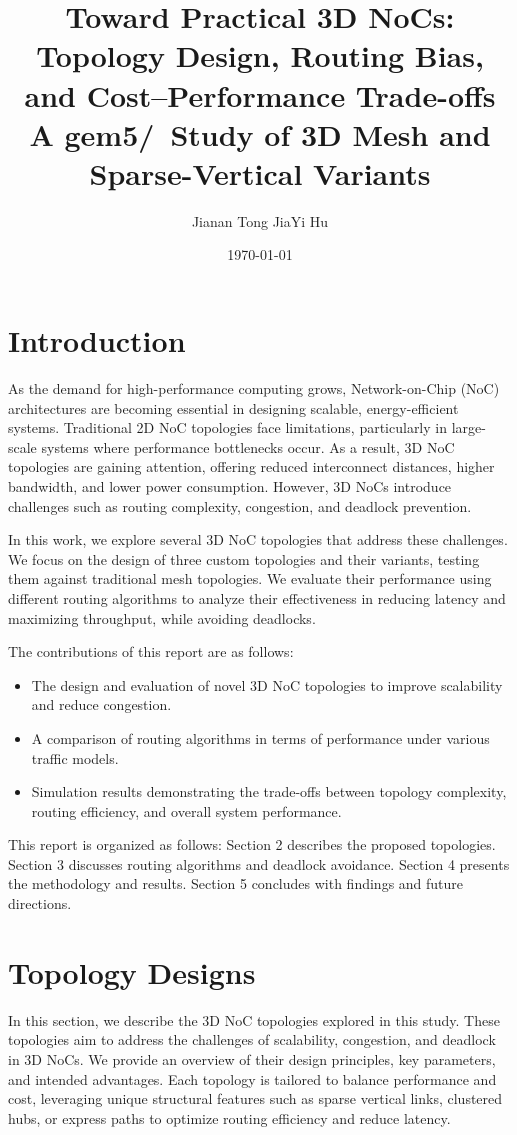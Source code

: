 \documentclass[11pt]{article}
\title{\textbf{Toward Practical 3D NoCs: Topology Design, Routing Bias, and Cost--Performance Trade-offs}\\
\large A gem5/\Ruby\ Study of 3D Mesh and Sparse-Vertical Variants}
\author{Jianan Tong \quad JiaYi Hu}
\date{\today}
\begin{document}
\maketitle

\section{Introduction}
As the demand for high-performance computing grows, Network-on-Chip (NoC) architectures are becoming essential in designing scalable, energy-efficient systems. Traditional 2D NoC topologies face limitations, particularly in large-scale systems where performance bottlenecks occur. As a result, 3D NoC topologies are gaining attention, offering reduced interconnect distances, higher bandwidth, and lower power consumption. However, 3D NoCs introduce challenges such as routing complexity, congestion, and deadlock prevention.

In this work, we explore several 3D NoC topologies that address these challenges. We focus on the design of three custom topologies and their variants, testing them against traditional mesh topologies. We evaluate their performance using different routing algorithms to analyze their effectiveness in reducing latency and maximizing throughput, while avoiding deadlocks.

The contributions of this report are as follows:
\begin{itemize}
\item The design and evaluation of novel 3D NoC topologies to improve scalability and reduce congestion.
\item A comparison of routing algorithms in terms of performance under various traffic models.
\item Simulation results demonstrating the trade-offs between topology complexity, routing efficiency, and overall system performance.
\end{itemize}

This report is organized as follows: Section 2 describes the proposed topologies. Section 3 discusses routing algorithms and deadlock avoidance. Section 4 presents the methodology and results. Section 5 concludes with findings and future directions.
\section{Topology Designs}
In this section, we describe the 3D NoC topologies explored in this study. These topologies aim to address the challenges of scalability, congestion, and deadlock in 3D NoCs. We provide an overview of their design principles, key parameters, and intended advantages. Each topology is tailored to balance performance and cost, leveraging unique structural features such as sparse vertical links, clustered hubs, or express paths to optimize routing efficiency and reduce latency.
\end{document}
